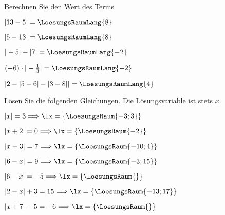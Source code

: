 
\renewcommand{\bbwAufgabenBlockID}{A1Be}

\renewcommand{\metaHeaderLine}{Aufgabenblatt}
\renewcommand{\arbeitsblattTitel}{Algebra: Betrag}



\arbeitsblattHeader{}
Berechnen Sie den Wert des Terms

\begin{bbwAufgabenBlock}
\item $|13-5| = \LoesungsRaumLang{8}$
\item $|5-13| = \LoesungsRaumLang{8}$
\item $|-5| - |7| = \LoesungsRaumLang{-2}$
\item $(-6)\cdot{}|-\frac{1}{3}| = \LoesungsRaumLang{-2}$
\item $|2 - |5-6| - |3-8|| = \LoesungsRaumLang{4}$
\end{bbwAufgabenBlock}

\platzFuerBerechnungenBisEndeSeite{}



Lösen Sie die folgenden Gleichungen. Die Lösungsvariable ist stets $x$.

\begin{bbwAufgabenBlock}
\item $|x|=3 \Longrightarrow \lx=\{ \LoesungsRaum{-3; 3\}}$
\item $|x+2|=0 \Longrightarrow \lx=\{ \LoesungsRaum{-2\}}$
\item $|x+3|=7 \Longrightarrow \lx=\{ \LoesungsRaum{-10;4\}}$
\item $|6-x|=9 \Longrightarrow \lx=\{ \LoesungsRaum{-3;15\}}$
\item $|6-x|=-5 \Longrightarrow \lx=\{ \LoesungsRaum{\}}$
\item $|2-x|+3=15 \Longrightarrow \lx=\{ \LoesungsRaum{-13;17\}}$
\item $|x+7|-5=-6 \Longrightarrow \lx=\{ \LoesungsRaum{\}}$
\end{bbwAufgabenBlock}


\platzFuerBerechnungenBisEndeSeite{}

\platzFuerBerechnungenBisEndeSeite{}


